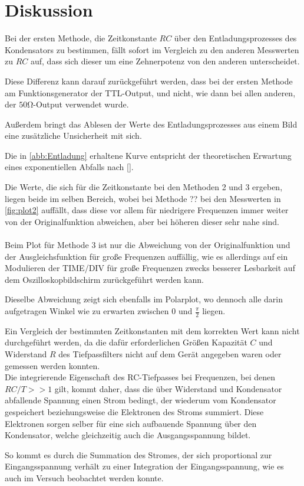 \section{Diskussion}
\label{sec:Diskussion}
Bei der ersten Methode, die Zeitkonstante $RC$ über den Entladungsprozesses des Kondensators zu bestimmen, fällt sofort im Vergleich zu
den anderen Messwerten zu $RC$ auf, dass sich dieser um eine Zehnerpotenz von den anderen unterscheidet. 

Diese Differenz kann darauf zurückgeführt werden, dass bei der ersten Methode am Funktionsgenerator der TTL-Output, und nicht, wie dann bei allen anderen, der $50\unit{\ohm}$-Output verwendet wurde. 

Außerdem bringt das Ablesen der Werte des Entladungsprozesses aus einem Bild eine zusätzliche Unsicherheit mit sich.

Die in \autoref{abb:Entladung} erhaltene Kurve entspricht der theoretischen Erwartung eines exponentiellen Abfalls nach \eqref{}.

Die Werte, die sich für die Zeitkonstante bei den Methoden 2 und 3 ergeben, liegen beide im selben Bereich, wobei bei Methode ?? bei den Messwerten
in \autoref{fig:plot2} auffällt, dass diese vor allem für niedrigere Frequenzen immer weiter von der Originalfunktion abweichen, aber bei höheren dieser sehr nahe sind.\\
\\
Beim Plot für Methode 3 ist nur die Abweichung von der Originalfunktion und der Ausgleichsfunktion für große Frequenzen auffällig, wie es allerdings auf ein Modulieren der TIME/DIV
für große Frequenzen zwecks besserer Lesbarkeit auf dem Oszilloskopbildschirm zurückgeführt werden kann. 

Dieselbe Abweichung zeigt sich ebenfalls im Polarplot, wo dennoch alle
darin aufgetragen Winkel wie zu erwarten zwischen $0$ und $\frac{\pi}{2}$ liegen.

Ein Vergleich der bestimmten Zeitkonstanten mit dem korrekten Wert kann nicht durchgeführt werden, da die dafür erforderlichen Größen Kapazität $C$ und Widerstand $R$ des Tiefpassfilters
 nicht auf dem Gerät angegeben waren oder gemessen werden konnten.\\

Die integrierende Eigenschaft des RC-Tiefpasses bei Frequenzen, bei denen $RC/T >> 1$ gilt, kommt daher, dass 
die über Widerstand und Kondensator abfallende Spannung einen Strom bedingt, der wiederum vom Kondensator gespeichert
beziehungsweise die Elektronen des Stroms summiert. Diese Elektronen sorgen selber für eine sich aufbauende Spannung
über den Kondensator, welche gleichzeitig auch die Ausgangsspannung bildet. 

So kommt es durch die Summation des
Stromes, der sich proportional zur Eingangsspannung verhält zu einer Integration der Eingangsspannung, wie es auch im Versuch beobachtet 
werden konnte.